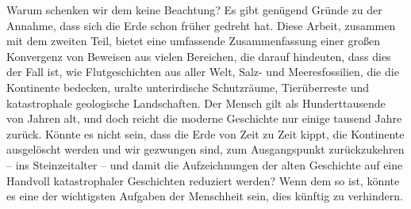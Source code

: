 \documentclass[10pt,twocolumn,letterpaper]{article}
\begin{document}
Warum schenken wir dem keine Beachtung? Es gibt genügend Gründe zu der Annahme, dass sich die Erde schon früher gedreht hat. Diese Arbeit, zusammen mit dem zweiten Teil, bietet eine umfassende Zusammenfassung einer großen Konvergenz von Beweisen aus vielen Bereichen, die darauf hindeuten, dass dies der Fall ist, wie Flutgeschichten aus aller Welt, Salz- und Meeresfossilien, die die Kontinente bedecken, uralte unterirdische Schutzräume, Tierüberreste und katastrophale geologische Landschaften. Der Mensch gilt als Hunderttausende von Jahren alt, und doch reicht die moderne Geschichte nur einige tausend Jahre zurück. Könnte es nicht sein, dass die Erde von Zeit zu Zeit kippt, die Kontinente ausgelöscht werden und wir gezwungen sind, zum Ausgangspunkt zurückzukehren – ins Steinzeitalter – und damit die Aufzeichnungen der alten Geschichte auf eine Handvoll katastrophaler Geschichten reduziert werden? Wenn dem so ist, könnte es eine der wichtigsten Aufgaben der Menschheit sein, dies künftig zu verhindern.
\end{document}
